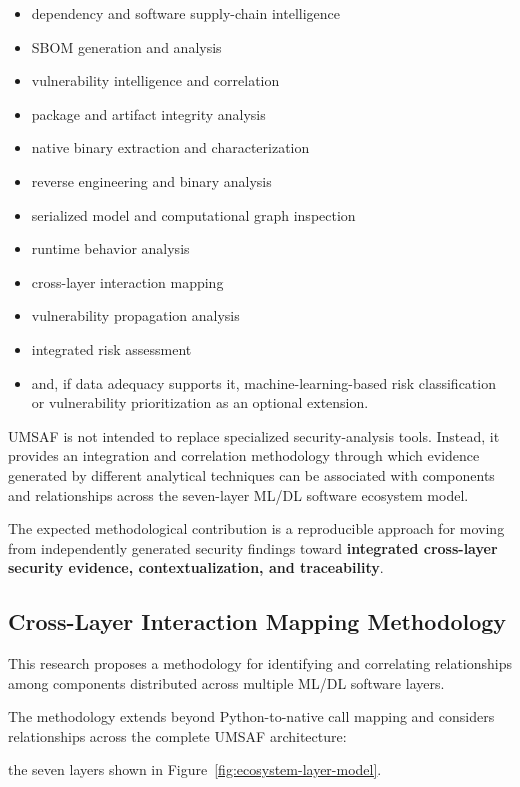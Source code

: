 \documentclass[
  12pt,
  letterpaper,
  oneside]{report}
\providecommand{\tightlist}{%
  \setlength{\itemsep}{0pt}\setlength{\parskip}{0pt}}
\begin{document}
\begin{itemize}
\tightlist
\item
  dependency and software supply-chain intelligence
\item
  SBOM generation and analysis
\item
  vulnerability intelligence and correlation
\item
  package and artifact integrity analysis
\item
  native binary extraction and characterization
\item
  reverse engineering and binary analysis
\item
  serialized model and computational graph inspection
\item
  runtime behavior analysis
\item
  cross-layer interaction mapping
\item
  vulnerability propagation analysis
\item
  integrated risk assessment
\item
  and, if data adequacy supports it, machine-learning-based risk
  classification or vulnerability prioritization as an optional
  extension.
\end{itemize}

UMSAF is not intended to replace specialized security-analysis tools.
Instead, it provides an integration and correlation methodology through
which evidence generated by different analytical techniques can be
associated with components and relationships across the seven-layer
ML/DL software ecosystem model.

The expected methodological contribution is a reproducible approach for
moving from independently generated security findings toward
\textbf{integrated cross-layer security evidence, contextualization, and
traceability}.

\subsection{Cross-Layer Interaction Mapping Methodology}\label{1222-cross-layer-interaction-mapping-methodology}

This research proposes a methodology for identifying and correlating
relationships among components distributed across multiple ML/DL
software layers.

The methodology extends beyond Python-to-native call mapping and
considers relationships across the complete UMSAF architecture:

the seven layers shown in Figure~\ref{fig:ecosystem-layer-model}.
\end{document}
